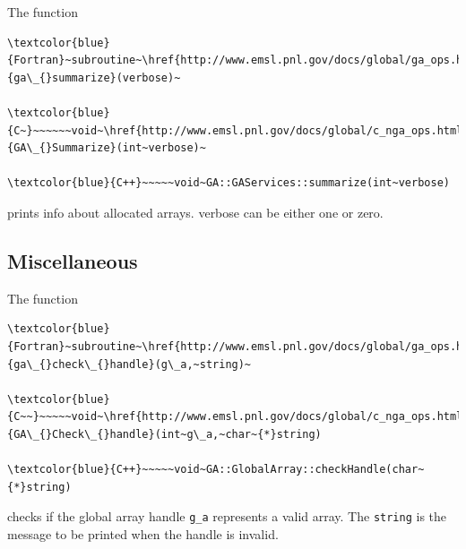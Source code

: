The function
\begin{verbatim}
\textcolor{blue}{Fortran}~subroutine~\href{http://www.emsl.pnl.gov/docs/global/ga_ops.html\#ga_summarize}{ga\_{}summarize}(verbose)~

\textcolor{blue}{C~}~~~~~~void~\href{http://www.emsl.pnl.gov/docs/global/c_nga_ops.html\#ga_summarize}{GA\_{}Summarize}(int~verbose)~

\textcolor{blue}{C++}~~~~~void~GA::GAServices::summarize(int~verbose)
\end{verbatim}
prints info about allocated arrays. verbose can be either one or zero. 


\subsection{Miscellaneous }

The function
\begin{verbatim}
\textcolor{blue}{Fortran}~subroutine~\href{http://www.emsl.pnl.gov/docs/global/ga_ops.html\#ga_check_handle}{ga\_{}check\_{}handle}(g\_a,~string)~

\textcolor{blue}{C~~}~~~~~void~\href{http://www.emsl.pnl.gov/docs/global/c_nga_ops.html\#ga_check_handle}{GA\_{}Check\_{}handle}(int~g\_a,~char~{*}string)

\textcolor{blue}{C++}~~~~~void~GA::GlobalArray::checkHandle(char~{*}string)
\end{verbatim}
checks if the global array handle \texttt{g\_a} represents a valid
array. The \texttt{string} is the message to be printed when the handle
is invalid.
